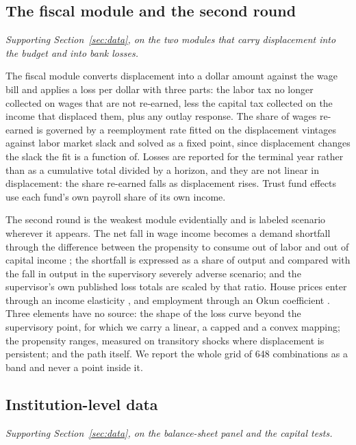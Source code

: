 \subsection{The fiscal module and the second round}

\emph{Supporting Section~\ref{sec:data}, on the two modules that carry displacement into the budget and into bank losses.}

The fiscal module converts displacement into a dollar amount against the wage bill and applies a
loss per dollar with three parts: the labor tax no longer collected on wages that are not
re-earned, less the capital tax collected on the income that displaced them, plus any outlay
response. The share of wages re-earned is governed by a reemployment rate fitted on the
displacement vintages against labor market slack and solved as a fixed point, since displacement
changes the slack the fit is a function of. Losses are reported for the terminal year rather than
as a cumulative total divided by a horizon, and they are not linear in displacement: the share
re-earned falls as displacement rises. Trust fund effects use each fund's own payroll share of its
own income.

The second round is the weakest module evidentially and is labeled scenario wherever it appears.
The net fall in wage income becomes a demand shortfall through the difference between the
propensity to consume out of labor and out of capital income
\citep{MianStraubSufi2020,FagerengHolmNatvik2021}; the shortfall is expressed as a share of output
and compared with the fall in output in the supervisory severely adverse scenario; and the
supervisor's own published loss totals are scaled by that ratio. House prices enter through an
income elasticity \citep{HarterDreiman2004}, and employment through an Okun coefficient
\citep{BallLeighLoungani2017}. Three elements have no source: the shape of the loss curve beyond
the supervisory point, for which we carry a linear, a capped and a convex mapping; the propensity
ranges, measured on transitory shocks where displacement is persistent; and the path itself. We
report the whole grid of 648 combinations as a band and never a point inside it.

\subsection{Institution-level data}

\emph{Supporting Section~\ref{sec:data}, on the balance-sheet panel and the capital tests.}

